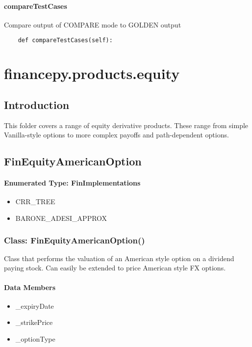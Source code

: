 \documentclass[twoside,11pt]{book}
\begin{document}
\subsubsection*{{\bf compareTestCases}}
Compare output of COMPARE mode to GOLDEN output  

\begin{lstlisting}
    def compareTestCases(self):
\end{lstlisting}


\chapter{financepy.products.equity}
\section{Introduction}

This folder covers a range of equity derivative products. These range from simple Vanilla-style options to more complex payoffs and path-dependent options. \newpage
\section{FinEquityAmericanOption}

\subsubsection{Enumerated Type: FinImplementations}
\begin{itemize}
\item{CRR\_TREE}
\item{BARONE\_ADESI\_APPROX}
\end{itemize}

\subsection*{Class: FinEquityAmericanOption()}
Class that performs the valuation of an American style option on a dividend paying stock. Can easily be extended to price American style FX options.  

\subsubsection*{Data Members}
\begin{itemize}
\item{\_expiryDate}
\item{\_strikePrice}
\item{\_optionType}
\end{itemize}
\end{document}
